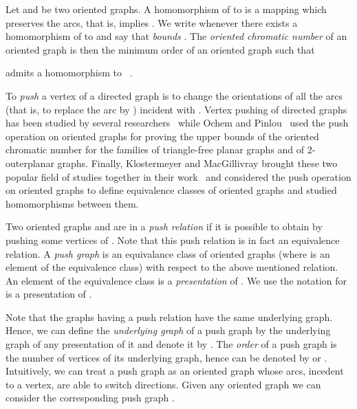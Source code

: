 \documentclass[10pt]{article}
\begin{document}
Let  and  be two oriented graphs. 
A homomorphism of  to  is a
 mapping  which preserves the arcs, that is,  implies . 
 We write  whenever there exists a 
 homomorphism of  to  and say that  \textit{bounds} .   
 The \textit{oriented chromatic number}  of an oriented graph  is 
 then the minimum order  of an oriented graph  such that

admits a homomorphism to ~\cite{orientedchi}.





  To \textit{push} a vertex  of a directed graph  is to change the 
  orientations  of all the arcs (that is, to replace the arc  by ) incident with . 
  Vertex pushing  of directed graphs has been studied by several 
  researchers~\cite{fisher-push, klostermeyer1, klostermeyer2, Mosesian, Pretzel1, Pretzel2, Pretzel3, Garyandwood}
  while Ochem and Pinlou~\cite{OPgirth4} used 
the push operation on oriented graphs for 
proving  the 
upper bounds of the  oriented chromatic number for  the families of triangle-free planar graphs and of 2-outerplanar graphs. 
Finally, Klostermeyer and MacGillivray brought these two popular field of studies 
together in their work~\cite{push} and considered the push operation on oriented graphs to define  equivalence classes of oriented graphs and studied homomorphisms between them. 

  
  

  Two  oriented graphs 
 and  are in a \textit{push relation} if it is possible to obtain  by pushing some vertices 
 of .
 Note that this push relation is in fact an
equivalence relation. A \textit{push graph}   is an equivalance class of oriented
graphs 
(where  is an element of the equivalence class) with respect to the
above mentioned relation. 
An element   of the equivalence class  is a
\textit{presentation} of . 
We use the notation   
for
  is a
presentation of .  
  
 

Note that the graphs having a push relation have the same underlying graph. Hence, we can define the \textit{underlying graph} of a push graph  by the underlying graph of any presentation of it and 
denote it by . 
The \textit{order} of a push graph is the number of vertices of its underlying graph, hence can be denoted by 
 or . 
Intuitively, we can treat a push graph as an oriented graph whose arcs, incedent to a vertex, are able to switch directions. 
Given  any oriented graph  we can consider the corresponding push graph 
. 
\end{document}
